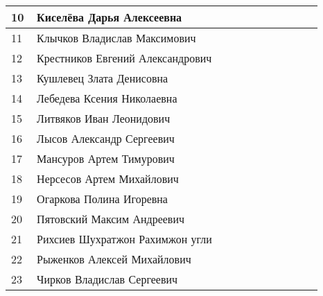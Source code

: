 \documentclass[a4paper,landscape,11pt]{article}
\begin{document}
\begin{tabular}{p{7pt}|l|p{\CS}|p{\CS}|p{\CS}|p{\CS}|p{\CS}|p{\CS}|p{\CS}|p{\CS}|p{\CS}}
10\,& Киселёва Дарья Алексеевна        &&&&&&&&\\
\midrule
11\,& Клычков Владислав Максимович     &&&&&&&&\\
12\,& Крестников Евгений Александрович &&&&&&&&\\
13\,& Кушлевец Злата Денисовна         &&&&&&&&\\
14\,& Лебедева Ксения Николаевна       &&&&&&&&\\
15\,& Литвяков Иван Леонидович         &&&&&&&&\\
\midrule
16\,& Лысов Александр Сергеевич        &&&&&&&&\\
17\,& Мансуров Артем Тимурович         &&&&&&&&\\
18\,& Нерсесов Артем Михайлович        &&&&&&&&\\ 
19\,& Огаркова Полина Игоревна         &&&&&&&&\\
20\,& Пятовский Максим Андреевич       &&&&&&&&\\
\midrule
21\,& Рихсиев Шухратжон Рахимжон угли  &&&&&&&&\\
22\,& Рыженков Алексей Михайлович      &&&&&&&&\\
23\,& Чирков Владислав Сергеевич       &&&&&&&&\\
\bottomrule
\end{tabular} 
\end{document}
